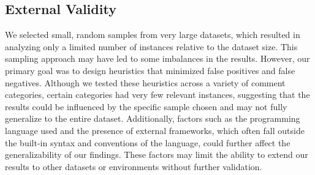 \subsection{External Validity}
We selected small, random samples from very large datasets, which resulted in analyzing only a limited number of instances relative to the dataset size. This sampling approach may have led to some imbalances in the results. However, our primary goal was to design heuristics that minimized false positives and false negatives. Although we tested these heuristics across a variety of comment categories, certain categories had very few relevant instances, suggesting that the results could be influenced by the specific sample chosen and may not fully generalize to the entire dataset.
Additionally, factors such as the programming language used and the presence of external frameworks, which often fall outside the built-in syntax and conventions of the language, could further affect the generalizability of our findings. These factors may limit the ability to extend our results to other datasets or environments without further validation.